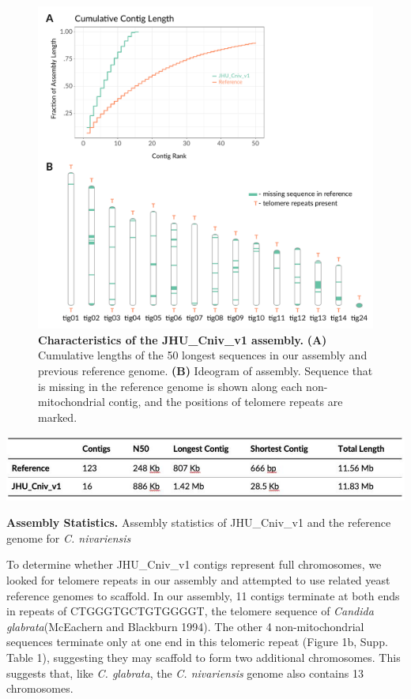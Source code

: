 \begin{figure}[!hb]
\centering
\includegraphics[width = 1\linewidth,keepaspectratio]{figure/asms.pdf}
\caption[Characteristics of the JHU\_Cniv\_v1 assembly]{{\bf Characteristics of the JHU\_Cniv\_v1 assembly.} {\bf (A)} Cumulative lengths of the 50 longest sequences in our assembly and previous reference genome. {\bf (B)} Ideogram of assembly. Sequence that is missing in the reference genome is shown along each non-mitochondrial contig, and the positions of telomere repeats are marked. }
\label{fig:asms}
\end{figure}


\begin{table}[!hb]
\centering
\includegraphics[width = 1\linewidth,keepaspectratio]{figure/asmstats.pdf}
\caption[Assembly Statistics]{{\bf Assembly Statistics.} Assembly statistics of JHU\_Cniv\_v1 and the reference genome for \textit{C. nivariensis} }
\label{tab:asmstats}
\end{table}


To determine whether JHU\_Cniv\_v1 contigs represent full chromosomes, we looked for telomere repeats in our assembly and attempted to use related yeast reference genomes to scaffold. In our assembly, 11 contigs terminate at both ends in repeats of CTGGGTGCTGTGGGGT, the telomere sequence of \textit{Candida glabrata}(McEachern and Blackburn 1994). The other 4 non-mitochondrial sequences terminate only at one end in this telomeric repeat (Figure 1b, Supp. Table 1), suggesting they may scaffold to form two additional chromosomes. This suggests that, like \textit{C. glabrata}, the \textit{C. nivariensis} genome also contains 13 chromosomes.

